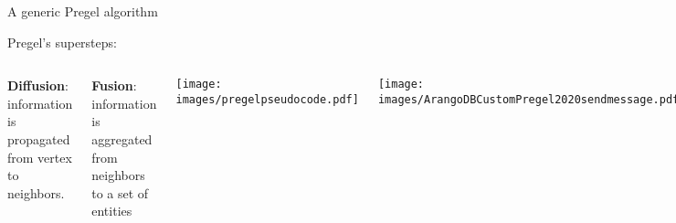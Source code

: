 \documentclass[aspectratio = 169, 15pt, trans]{beamer}
\begin{document}
    \begin{frame}{A generic Pregel algorithm}
        
        \hspace*{-0.7cm}
        {\color{darkgray}Pregel's supersteps:}
        \begin{columns}[t]
                \vspace*{-0.3cm}
                
                \hspace*{-0.1cm}
                {%
                    \color{darkgray}%
                    \small\textbf{Diffusion}: information is propagated from vertex to neighbors.
                }
                
                \hspace*{-0.1cm}
                {%
                    \color{darkgray}%
                    \small\textbf{Fusion}: information is aggregated from neighbors to a set of entities
                }
                
                \vspace*{-1cm}
                \hspace*{-2cm}
                \begin{center}
                    \texttt{[image: images/pregelpseudocode.pdf]}
                \end{center}
                
                \vspace*{-0.1cm}
                \begin{center}
                    \hspace*{-4.7cm}
                    \texttt{[image: images/ArangoDBCustomPregel2020sendmessage.pdf]}
                \end{center}
        \end{columns}
\end{frame}
\end{document}
